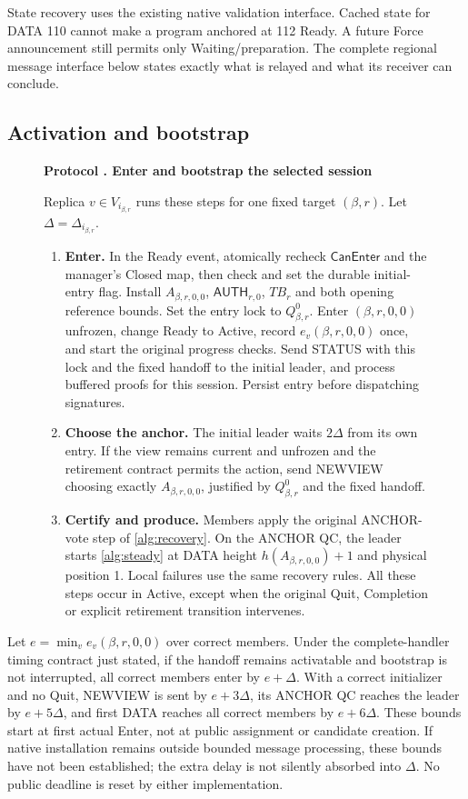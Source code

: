 \documentclass[11pt,a4paper]{article}
\newcommand{\TB}{\mathit{TB}}
\newcommand{\tagg}[1]{\ensuremath{\mathsf{#1}}}
\newcounter{protocol}
\newenvironment{protocol}[3][htbp]{\begin{figure}[#1]\refstepcounter{protocol}\label{#2}
\begin{mdframed}[linewidth=.6pt,skipabove=0pt,skipbelow=0pt,
innertopmargin=7pt,innerbottommargin=7pt]\small
\textbf{Protocol \theprotocol. #3}\par\smallskip}{\end{mdframed}\end{figure}}
\begin{document}
State recovery uses the existing native validation interface. Cached state
for DATA 110 cannot make a program anchored at 112 Ready. A future Force
announcement still permits only Waiting/preparation. The complete regional
message interface below states exactly what is relayed and what its
receiver can conclude.



\subsection{Activation and bootstrap}
\label{sec:ready}
\begin{protocol}[H]{alg:bootstrap}{Enter and bootstrap the selected session}
Replica $v\in V_{i_{\beta,r}}$ runs these steps for one fixed target
$(\beta,r)$. Let $\Delta=\Delta_{i_{\beta,r}}$.
\begin{enumerate}[label=\textbf{\arabic*)},itemsep=3pt]
\item \textbf{Enter.} In the Ready event, atomically recheck
$\tagg{CanEnter}$ and the manager's Closed map, then check and set
the durable initial-entry flag. Install $A_{\beta,r,0,0}$,
$\tagg{AUTH}_{r,0}$, $\TB_r$ and both opening reference bounds.
Set the entry lock to $Q^0_{\beta,r}$. Enter $(\beta,r,0,0)$
unfrozen, change Ready to Active, record $e_v(\beta,r,0,0)$ once,
and start the original progress checks. Send STATUS with this lock
and the fixed handoff to the initial leader, and process buffered
proofs for this session. Persist entry before dispatching signatures.
\item \textbf{Choose the anchor.} The initial leader waits
$2\Delta$ from its own entry. If the view remains current and
unfrozen and the retirement contract permits the action, send NEWVIEW
choosing exactly $A_{\beta,r,0,0}$, justified by $Q^0_{\beta,r}$
and the fixed handoff.
\item \textbf{Certify and produce.} Members apply the original
ANCHOR-vote step of \cref{alg:recovery}. On the ANCHOR QC, the leader
starts \cref{alg:steady} at DATA height $h(A_{\beta,r,0,0})+1$
and physical position 1. Local failures use the same recovery rules.
All these steps occur in Active, except when the original Quit,
Completion or explicit retirement transition intervenes.
\end{enumerate}
\end{protocol}

Let $e=\min_v e_v(\beta,r,0,0)$ over correct members. Under the
complete-handler timing contract just stated, if the handoff remains
activatable and bootstrap is not interrupted, all correct members enter
by $e+\Delta$. With a correct initializer and no Quit, NEWVIEW is sent
by $e+3\Delta$, its ANCHOR QC reaches the leader by $e+5\Delta$, and
first DATA reaches all correct members by $e+6\Delta$. These bounds
start at first actual Enter, not at public assignment or candidate creation.
If native installation remains outside bounded message processing, these
bounds have not been established; the extra delay is not silently absorbed
into $\Delta$. No public deadline is reset by either implementation.
\end{document}
